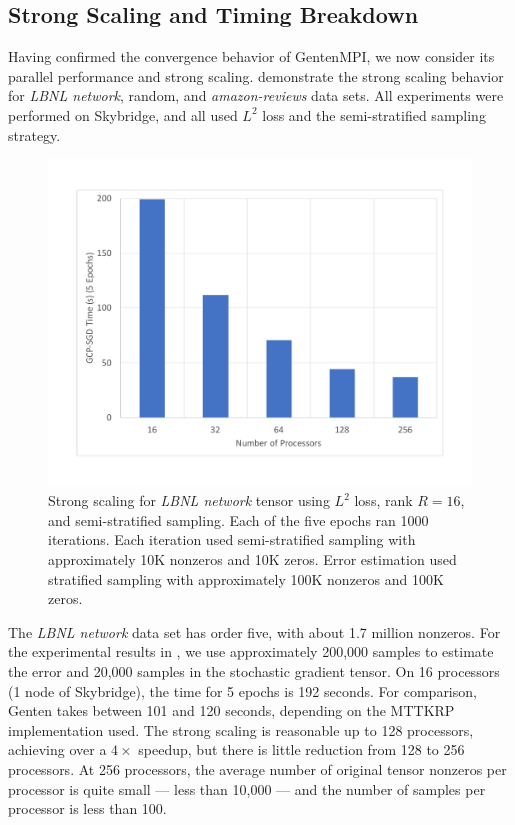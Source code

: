 \subsection{Strong Scaling and Timing Breakdown}

Having confirmed the convergence behavior of GentenMPI, we now consider its parallel performance and strong scaling.
 demonstrate the strong scaling behavior for \emph{LBNL network}, random, and \emph{amazon-reviews} data sets.
All experiments were performed on Skybridge, and all used $L^2$ loss and the semi-stratified sampling strategy.

\begin{figure}
\centering
\includegraphics[keepaspectratio=true, width=4.5in]{figs/strongLBNL}
\caption[Strong scaling of GCP-SGD for \emph{LBNL network} tensor]{Strong scaling for \emph{LBNL network} tensor using $L^2$ loss, rank $R=16$, and semi-stratified sampling.  
Each of the five epochs ran 1000 iterations.  
Each iteration used semi-stratified sampling with approximately 10K nonzeros and 10K zeros. 
Error estimation used stratified sampling with approximately 100K nonzeros and 100K zeros. 
}
\label{fig:lbnl_scaling}
\end{figure}

The \emph{LBNL network} data set has order five, with about 1.7 million nonzeros.
For the experimental results in , we use approximately 200{,}000 samples to estimate the error and 20{,}000 samples in the stochastic gradient tensor.
On 16 processors (1 node of Skybridge), the time for 5 epochs is 192 seconds.
For comparison, Genten \cite{PK19} takes between 101 and 120 seconds, depending on the MTTKRP implementation used.
The strong scaling is reasonable up to 128 processors, achieving over a $4\times$ speedup, but there is little reduction from 128 to 256 processors.
At 256 processors, the average number of original tensor nonzeros per processor is quite small --- less than 10{,}000 --- and the number of samples per processor is less than 100.

